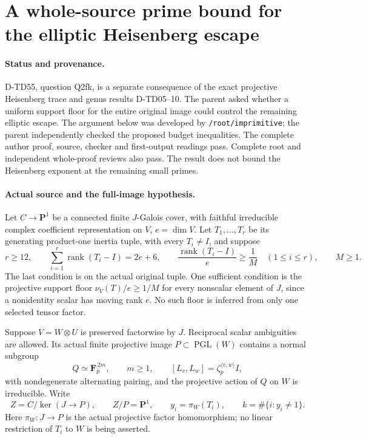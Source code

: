\section{A whole-source prime bound for the elliptic Heisenberg escape}
\label{sec:elliptic-heisenberg-prime}

\paragraph{Status and provenance.}
D-TD55, question Q2fk, is a separate consequence of the exact
projective Heisenberg trace and genus results D-TD05--10.  The parent
asked whether a uniform support floor for the entire original image
could control the remaining elliptic escape.  The argument below was
developed by \texttt{/root/imprimitive}; the parent independently checked
the proposed budget inequalities.  The complete author proof, source,
checker and first-output readings pass.  Complete root and independent
whole-proof reviews also pass.  The result does not bound the
Heisenberg exponent at the remaining small primes.

\paragraph{Actual source and the full-image hypothesis.}
Let \(C\to\mathbf P^1\) be a connected finite \(J\)-Galois cover, with
faithful irreducible complex coefficient representation on \(V\),
\(e=\dim V\).  Let \(T_1,\ldots,T_r\) be its generating product-one
inertia tuple, with every \(T_i\ne I\), and suppose
\[
 r\ge12,\qquad
 \sum_{i=1}^r\operatorname{rank}(T_i-I)=2e+6,\qquad
 \frac{\operatorname{rank}(T_i-I)}e\ge\frac1M
 \quad(1\le i\le r),
 \qquad M\ge1.
 \tag{EHP.1}
\]
The last condition is on the actual original tuple.  One sufficient
condition is the projective support floor
\(\nu_V(T)/e\ge1/M\) for every nonscalar element of \(J\), since a
nonidentity scalar has moving rank \(e\).  No such floor is inferred
from only one selected tensor factor.

Suppose \(V=W\otimes U\) is preserved factorwise by \(J\).  Reciprocal
scalar ambiguities are allowed.  Its actual finite projective image
\(P\subset\operatorname{PGL}(W)\) contains a normal subgroup
\[
 Q\simeq\mathbf F_p^{\,2m},\qquad m\ge1,
 \qquad
 [L_v,L_w]=\zeta_p^{\langle v,w\rangle}I,
 \tag{EHP.2}
\]
with nondegenerate alternating pairing, and the projective action of
\(Q\) on \(W\) is irreducible.  Write
\[
 Z=C/\ker(J\to P),\qquad Z/P=\mathbf P^1,\qquad
 y_i=\pi_W(T_i),\qquad
 k=\#\{i:y_i\ne1\}.
 \tag{EHP.3}
\]
Here \(\pi_W:J\to P\) is the actual projective factor homomorphism;
no linear restriction of \(T_i\) to \(W\) is being asserted.

